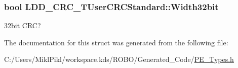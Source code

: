 \subsubsection[{Width32bit}]{\setlength{\rightskip}{0pt plus 5cm}bool L\+D\+D\+\_\+\+C\+R\+C\+\_\+\+T\+User\+C\+R\+C\+Standard\+::\+Width32bit}\label{struct_l_d_d___c_r_c___t_user_c_r_c_standard_a82a24fa9104800759f278afc36a4e00e}
32bit C\+R\+C? 

The documentation for this struct was generated from the following file\+:\begin{DoxyCompactItemize}
\item 
C\+:/\+Users/\+Mikl\+Pikl/workspace.\+kds/\+R\+O\+B\+O/\+Generated\+\_\+\+Code/\hyperlink{_p_e___types_8h}{P\+E\+\_\+\+Types.\+h}\end{DoxyCompactItemize}
